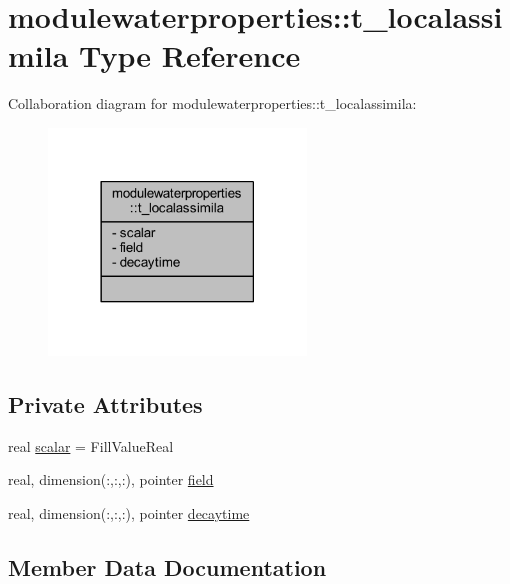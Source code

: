 \hypertarget{structmodulewaterproperties_1_1t__localassimila}{}\section{modulewaterproperties\+:\+:t\+\_\+localassimila Type Reference}
\label{structmodulewaterproperties_1_1t__localassimila}


Collaboration diagram for modulewaterproperties\+:\+:t\+\_\+localassimila\+:\nopagebreak
\begin{figure}[H]
\begin{center}
\leavevmode
\includegraphics[width=194pt]{structmodulewaterproperties_1_1t__localassimila__coll__graph}
\end{center}
\end{figure}
\subsection*{Private Attributes}
\begin{DoxyCompactItemize}
\item 
real \mbox{\hyperlink{structmodulewaterproperties_1_1t__localassimila_a8db719c1676073188dd1aa00e509d776}{scalar}} = Fill\+Value\+Real
\item 
real, dimension(\+:,\+:,\+:), pointer \mbox{\hyperlink{structmodulewaterproperties_1_1t__localassimila_ab836eb7187f90628f4c0140782b75510}{field}}
\item 
real, dimension(\+:,\+:,\+:), pointer \mbox{\hyperlink{structmodulewaterproperties_1_1t__localassimila_aed0369dd83be614d8e786c35cd695610}{decaytime}}
\end{DoxyCompactItemize}


\subsection{Member Data Documentation}
\mbox{\label{structmodulewaterproperties_1_1t__localassimila_aed0369dd83be614d8e786c35cd695610}} 
